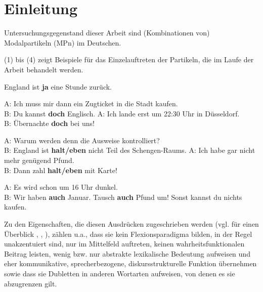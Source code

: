 \chapter{Einleitung}
\label{chapter:einleitung}
Untersuchungsgegenstand dieser Arbeit sind (Kombinationen von) Modalpartikeln (MPn) im Deutschen.

(1) bis (4) zeigt Beispiele für das Einzelauftreten der Partikeln, die im Laufe der Arbeit behandelt werden.

\begin{exe}
	\ex\label{1} 
		England ist \textbf{ja} eine Stunde zurück.	
\end{exe}
\vspace{-0.65cm}
\begin{exe}
	\ex\label{2} 
		\begin{xlist}
		\ex\label{2a}A: Ich muss mir dann ein Zugticket in die Stadt kaufen. \\B: Du kannst \textbf{doch} Englisch.
		\ex\label{2b}A: Ich lande erst um 22:30 Uhr in Düsseldorf.\\B: Übernachte \textbf{doch} bei uns!	
	\end{xlist}
\end{exe}
\begin{exe}
	\ex\label{3} 
		\begin{xlist}
		\ex\label{3a}A: Warum werden denn die Ausweise kontrolliert? \\B: England ist \textbf{halt/eben} nicht Teil des Schengen-Raums.
		\ex\label{3b}A: Ich habe gar nicht mehr genügend Pfund.\\B: Dann zahl \textbf{halt/eben} mit Karte!
	\end{xlist}
\end{exe}
	
\begin{exe}
	\ex\label{4} 
		\begin{xlist}
		\ex\label{4a}A: Es wird schon um 16 Uhr dunkel. \\B: Wir haben \textbf{auch} Januar.
		\ex\label{4b}Tausch \textbf{auch} Pfund um! Sonst kannst du nichts kaufen.
	\end{xlist}
\end{exe}
Zu den Eigenschaften, die diesen Ausdrücken zugeschrieben werden (vgl. für einen Überblick \citealt{Diewald2007}, \citealt[628-630]{Thurmair2013}, \citealt[Kapitel 2]{Mueller2014b}), zählen u.a., dass sie kein Flexionsparadigma bilden, in der Regel unakzentuiert sind, nur im Mittelfeld auftreten, keinen wahrheitsfunktionalen Beitrag leisten, wenig bzw. nur abstrakte lexikalische Bedeutung aufweisen und eher kommunikative, spre\-cherbezogene, diskursstrukturelle Funktion übernehmen sowie dass sie \glq Dubletten\grq {} in anderen Wortarten aufweisen, von denen es sie abzugrenzen gilt.

